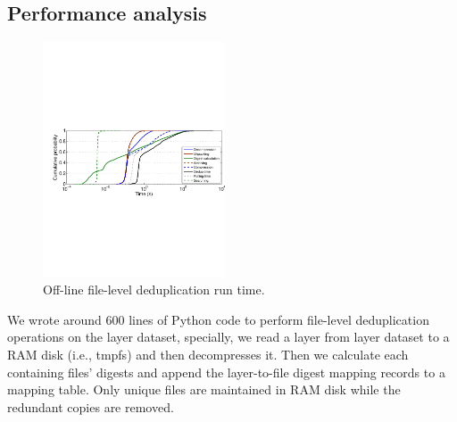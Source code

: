 \subsection{Performance analysis}
%
\begin{figure}
	\centering
	\includegraphics[width=0.48\textwidth]{graphs/res-time.pdf}
	\caption{Off-line file-level deduplication run time.
	}
	\label{fig:dedup-res}
\end{figure}

%
%
%

We wrote around 600 lines of Python code to perform file-level deduplication
operations on the layer dataset, specially, we read a layer from layer dataset
to a RAM disk (i.e., tmpfs) and then decompresses it. Then we
calculate each containing files' digests and append the layer-to-file digest
mapping records to a mapping table.  Only unique files are maintained in RAM
disk while the redundant copies are removed.

